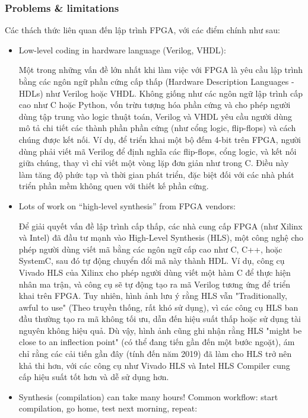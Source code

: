 \documentclass[a4paper]{article}
\begin{document}
\subsubsection{Problems \& limitations}
Các thách thức liên quan đến lập trình FPGA, với các điểm chính như sau:
\begin{itemize}
    \item Low-level coding in hardware language (Verilog, VHDL):\par Một trong những vấn đề lớn nhất khi làm việc với FPGA là yêu cầu lập trình bằng các ngôn ngữ phần cứng cấp thấp (Hardware Description Languages - HDLs) như Verilog hoặc VHDL. Không giống như các ngôn ngữ lập trình cấp cao như C hoặc Python, vốn trừu tượng hóa phần cứng và cho phép người dùng tập trung vào logic thuật toán, Verilog và VHDL yêu cầu người dùng mô tả chi tiết các thành phần phần cứng (như cổng logic, flip-flops) và cách chúng được kết nối. Ví dụ, để triển khai một bộ đếm 4-bit trên FPGA, người dùng phải viết mã Verilog để định nghĩa các flip-flops, cổng logic, và kết nối giữa chúng, thay vì chỉ viết một vòng lặp đơn giản như trong C. Điều này làm tăng độ phức tạp và thời gian phát triển, đặc biệt đối với các nhà phát triển phần mềm không quen với thiết kế phần cứng.
    \item Lots of work on “high-level synthesis” from FPGA vendors: \par Để giải quyết vấn đề lập trình cấp thấp, các nhà cung cấp FPGA (như Xilinx và Intel) đã đầu tư mạnh vào High-Level Synthesis (HLS), một công nghệ cho phép người dùng viết mã bằng các ngôn ngữ cấp cao như C, C++, hoặc SystemC, sau đó tự động chuyển đổi mã này thành HDL. Ví dụ, công cụ Vivado HLS của Xilinx cho phép người dùng viết một hàm C để thực hiện nhân ma trận, và công cụ sẽ tự động tạo ra mã Verilog tương ứng để triển khai trên FPGA. Tuy nhiên, hình ảnh lưu ý rằng HLS vẫn "Traditionally, awful to use" (Theo truyền thống, rất khó sử dụng), vì các công cụ HLS ban đầu thường tạo ra mã không tối ưu, dẫn đến hiệu suất thấp hoặc sử dụng tài nguyên không hiệu quả. Dù vậy, hình ảnh cũng ghi nhận rằng HLS "might be close to an inflection point" (có thể đang tiến gần đến một bước ngoặt), ám chỉ rằng các cải tiến gần đây (tính đến năm 2019) đã làm cho HLS trở nên khả thi hơn, với các công cụ như Vivado HLS và Intel HLS Compiler cung cấp hiệu suất tốt hơn và dễ sử dụng hơn.
    \item Synthesis (compilation) can take many hours! Common workflow: start compilation, go home, test next morning, repeat:\par

\end{itemize}
\end{document}
